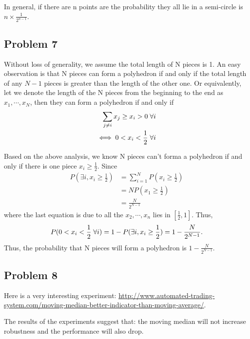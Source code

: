 \documentclass[11pt]{article}
\theoremstyle{remark}
\begin{document}
In general, if there are n points are the probability they all lie in a semi-circle is $n \times \frac{1}{2^{n-1}}$.

\subsection{Problem 7}
Without loss of generality, we assume the total length of N pieces is 1. An easy observation is that N pieces can form a polyhedron if and only if the total length of any $N-1$ pieces is greater than the length of the other one. Or equivalently, let we denote the length of the N pieces from the beginning to the end as $x_{1},\cdots,x_{N}$, then they can form a polyhedron if and only if
\begin{align}
\sum_{j\neq i}x_{j}\geq x_{i}>0 \nonumber \hspace{1mm}\forall i \\
\iff 0<x_{i}<\frac{1}{2} \nonumber \hspace{1mm}\forall i
\end{align}

Based on the above analysis, we know N pieces can't forma a polyhedron if and only if there is one piece $x_{i}\geq \frac{1}{2}$. Since
\begin{align}
P(\exists i,x_{i}\geq \frac{1}{2})&=\sum_{i=1}^{N}P(x_{i}\geq \frac{1}{2})\nonumber \\
&=NP(x_{1}\geq \frac{1}{2})\nonumber \\
&=\frac{N}{2^{N-1}} \nonumber
\end{align}
where the last equation is due to all the $x_{2},\cdots, x_{n}$ lies in $[\frac{1}{2},1]$.
Thus,
\begin{equation}
P(0<x_{i}<\frac{1}{2} \nonumber \hspace{1mm}\forall i)=1-P(\exists i,x_{i}\geq \frac{1}{2})=1-\frac{N}{2^{N-1}}. \nonumber 
\end{equation}
Thus, the probability that N pieces will form a polyhedron is $1-\frac{N}{2^{N-1}}$.

\subsection{Problem 8}
Here is a very interesting experiment:
\url{http://www.automated-trading-system.com/moving-median-better-indicator-than-moving-average/}.

The results of the experiments suggest that: the moving median will not increase robustness and the performance will also drop.
\end{document}

